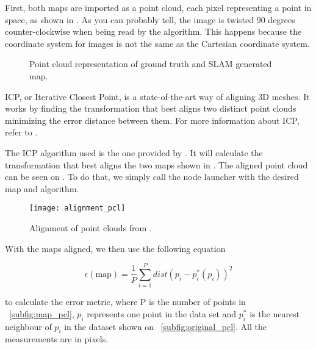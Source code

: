 First, both maps are imported as a point cloud, each pixel representing a point in space, as shown in . As you can probably tell, the image is twisted 90 degrees counter-clockwise when being read by the algorithm. This happens because the coordinate system for images is not the same as the Cartesian coordinate system.

\begin{figure}[!ht]
     \centering
     \hspace{0cm}
     \caption{Point cloud representation of ground truth and SLAM generated map.}
     \label{fig:point_cloud}
\end{figure}

ICP, or Iterative Closest Point, is a state-of-the-art way of aligning 3D meshes. It works by finding the transformation that best aligns two distinct point clouds minimizing the error distance between them. For more information about ICP, refer to \citeauthor{besl1992method}.

The ICP algorithm used is the one provided by \citeauthor{flannigan2019}. It will calculate the transformation that best aligns the two maps shown in . The aligned point cloud can be seen on . To do that, we simply call the node launcher with the desired map and algorithm. 

\begin{figure}[!ht]
    \centering
    \texttt{[image: alignment\_pcl]}
    \caption{Alignment of point clouds from .}
    \label{fig:alignment_pcl}
\end{figure}

With the maps aligned, we then use the following equation

\begin{equation}
\epsilon(\text{map}) = \frac{1}{P} \sum_{i=1}^P dist(p_i - p_i^*(p_i))^2
\end{equation}

\noindent to calculate the error metric, where P is the number of points in \figurename~\ref{subfig:map_pcl}, $p_i$ represents one point in the data set and $p_i^*$ is the nearest neighbour of $p_i$ in the dataset shown on \figurename~\ref{subfig:original_pcl}. All the measurements are in pixels.

